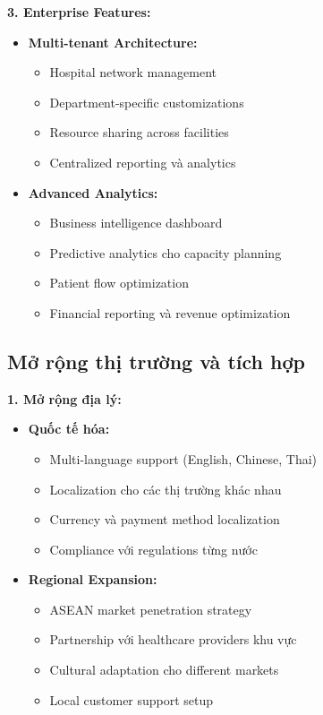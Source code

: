 \documentclass[../DoAn.tex]{subfiles}
\begin{document}
\textbf{3. Enterprise Features:}
\begin{itemize}
    \item \textbf{Multi-tenant Architecture:}
    \begin{itemize}
        \item Hospital network management
        \item Department-specific customizations
        \item Resource sharing across facilities
        \item Centralized reporting và analytics
    \end{itemize}
    
    \item \textbf{Advanced Analytics:}
    \begin{itemize}
        \item Business intelligence dashboard
        \item Predictive analytics cho capacity planning
        \item Patient flow optimization
        \item Financial reporting và revenue optimization
    \end{itemize}
\end{itemize}

\subsection{Mở rộng thị trường và tích hợp}

\textbf{1. Mở rộng địa lý:}
\begin{itemize}
    \item \textbf{Quốc tế hóa:}
    \begin{itemize}
        \item Multi-language support (English, Chinese, Thai)
        \item Localization cho các thị trường khác nhau
        \item Currency và payment method localization
        \item Compliance với regulations từng nước
    \end{itemize}
    
    \item \textbf{Regional Expansion:}
    \begin{itemize}
        \item ASEAN market penetration strategy
        \item Partnership với healthcare providers khu vực
        \item Cultural adaptation cho different markets
        \item Local customer support setup
    \end{itemize}
\end{itemize}
\end{document}
